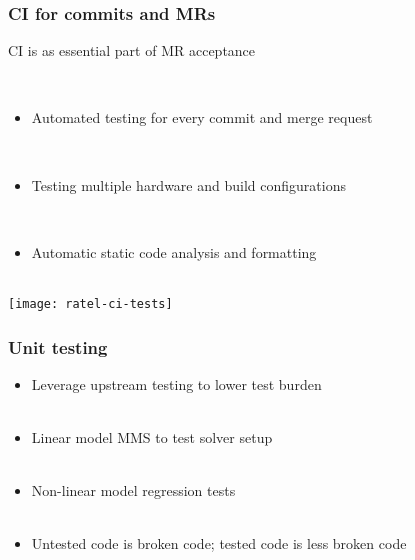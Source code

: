 \documentclass{beamer}
\begin{document}
\begin{frame}
\begin{center}
\frametitle{CI for commits and MRs}

CI is as essential part of MR acceptance

~\\

\begin{itemize}

\item Automated testing for every commit and merge request

~\\

\item Testing multiple hardware and build configurations

~\\

\item Automatic static code analysis and formatting

\end{itemize}

~\\

\texttt{[image: ratel-ci-tests]}

\end{center}
\end{frame}


\begin{frame}
\begin{center}
\frametitle{Unit testing}

\begin{itemize}

\item Leverage upstream testing to lower test burden\\

~\\

\item Linear model MMS to test solver setup\\

~\\

\item Non-linear model regression tests\\

~\\

\item Untested code is broken code; tested code is less broken code\\

\end{itemize}

\end{center}
\end{frame}
\end{document}
